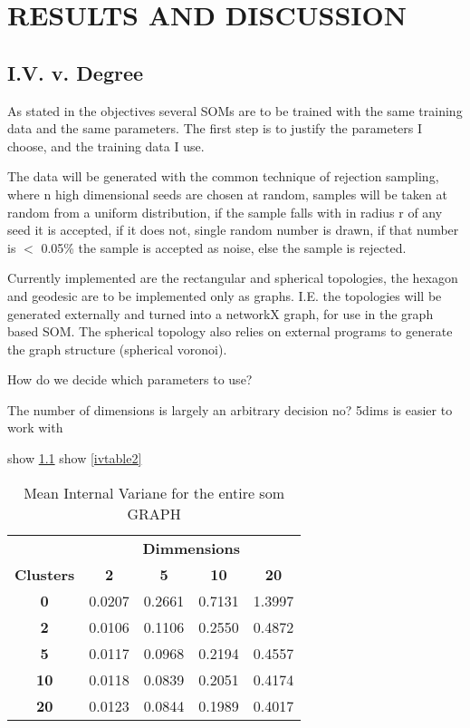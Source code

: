 \chapter{RESULTS AND DISCUSSION}




\section{I.V. v. Degree}

As stated in the objectives several SOMs are to be trained with the same
training data and the same parameters.  The first step is to justify the
parameters I choose, and the training data I use.

The data will be generated with the common technique of rejection sampling,
where n high dimensional seeds are chosen at random, samples will be taken
at random from a uniform distribution, if the sample falls with in radius r of
any seed it is accepted, if it does not, single random number is drawn, if that
number is \(<\) 0.05\% the sample is accepted as noise, else the sample is rejected.

Currently implemented are the rectangular and spherical topologies, the hexagon
and geodesic are to be implemented only as graphs.  I.E. the topologies will be
generated externally and turned into a networkX graph, for use in the graph
based SOM. The spherical topology also relies on external programs to generate
the graph structure (spherical voronoi).

How do we decide which parameters to use?

The number of dimensions is largely an arbitrary decision no?
5dims is easier to work with

show \ref{ivtable1}
show \ref{ivtable2}

\begin{table}
\caption{Mean Internal Variane for the entire som GRAPH}
\label{ivtable1}
\begin{tabular}{|c||c|c|c|c|}
\hline
&\multicolumn{4}{c|}{\textbf{Dimmensions}}\\
\textbf{Clusters} & \multicolumn{1}{c}{\textbf{2}} &
\multicolumn{1}{c}{\textbf{5}} & \multicolumn{1}{c}{\textbf{10}} &
\multicolumn{1}{c|}{\textbf{20}}\\
\hline
\hline
\textbf{0} & 0.0207& 0.2661& 0.7131& 1.3997 \\
\hline
\textbf{2} & 0.0106& 0.1106& 0.2550& 0.4872 \\
\hline
\textbf{5} & 0.0117& 0.0968& 0.2194& 0.4557 \\
\hline
\textbf{10} & 0.0118& 0.0839& 0.2051& 0.4174 \\
\hline
\textbf{20} & 0.0123& 0.0844& 0.1989& 0.4017 \\
\hline
\end{tabular} \end{table}



